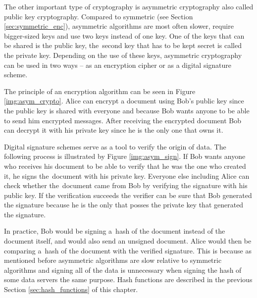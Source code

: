 The other important type of cryptography is asymmetric cryptography also called public key cryptography. Compared to symmetric (see Section \ref{sec:symmetric_enc}), asymmetric algorithms are most often slower, require bigger-sized keys and use two keys instead of one key. One of the keys that can be shared is the public key, the~second key that has to be kept secret is called the private key. Depending on the use of these keys, asymmetric cryptography can be used in two ways -- as an encryption cipher or as a digital signature scheme.

The principle of an encryption algorithm can be seen in Figure \ref{img:asym_crypto}. Alice can encrypt a document using Bob's public key since the public key is shared with everyone and because Bob wants anyone to be able to send him encrypted messages. After receiving the encrypted document Bob can decrypt it with his private key since he is the only one that owns it. \cite{Smart2004}


Digital signature schemes serve as a tool to verify the origin of data. The following process is illustrated by Figure \ref{img:asym_sign}. If Bob wants anyone who receives his document to be able to verify that he was the one who created it, he signs the~document with his private key. Everyone else including Alice can check whether the~document came from Bob by verifying the signature with his public key. If the verification succeeds the verifier can be sure that Bob generated the signature because he is the only that posses the private key that generated the signature. \cite{Paar2010}

In practice, Bob would be signing a~hash of the document instead of the document itself, and would also send an unsigned document. Alice would then be comparing a~hash of the document with the verified signature. This is because as mentioned before asymmetric algorithms are slow relative to symmetric algorithms and signing all of the data is unnecessary when signing the hash of some data servers the same purpose. Hash functions are described in the previous Section \ref{sec:hash_functions} of this chapter.

